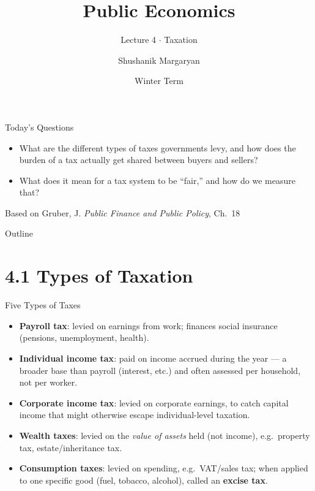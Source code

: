 \documentclass[11pt,aspectratio=169]{beamer}
\title{Public Economics}
\subtitle{Lecture 4 \(\cdot\) Taxation}
\author{Shushanik Margaryan}
\institute{WU Vienna University of Economics and Business}
\date{Winter Term}
\begin{document}
\begin{frame}
  \titlepage
\end{frame}

\begin{frame}{Today's Questions}
  \begin{itemize}
    \item What are the different types of taxes governments levy, and how does the burden of a tax actually get shared between buyers and sellers?
    \item What does it mean for a tax system to be ``fair,'' and how do we measure that?
 
  \end{itemize}
  \vspace{1em}
  \begin{block}{Based on}
    Gruber, J. \emph{Public Finance and Public Policy}, Ch.\ 18  
  \end{block}
\end{frame}

\begin{frame}{Outline}
  \tableofcontents
\end{frame}

\section{4.1 Types of Taxation}

\begin{frame}{Five Types of Taxes}
  \small
  \begin{itemize}
    \item \textbf{Payroll tax}: levied on earnings from work; finances social insurance (pensions, unemployment, health).
    \item \textbf{Individual income tax}: paid on income accrued during the year --- a broader base than payroll (interest, etc.) and often assessed per household, not per worker.
    \item \textbf{Corporate income tax}: levied on corporate earnings, to catch capital income that might otherwise escape individual-level taxation.
    \item \textbf{Wealth taxes}: levied on the \emph{value of assets} held (not income), e.g.\ property tax, estate/inheritance tax.
    \item \textbf{Consumption taxes}: levied on spending, e.g.\ VAT/sales tax; when applied to one specific good (fuel, tobacco, alcohol), called an \textbf{excise tax}.
  \end{itemize}
  \vspace{0.3em}
  \centering

\end{frame}
\end{document}
